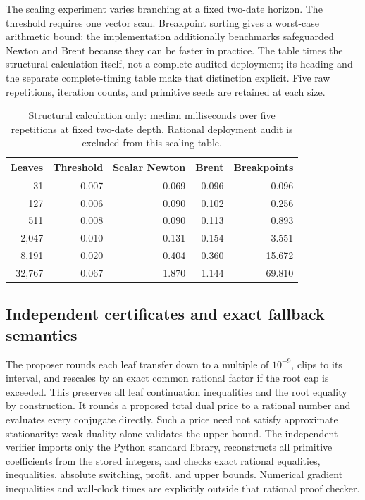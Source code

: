 \documentclass[11pt,letterpaper]{article}
\theoremstyle{definition}
\newcommand{\1}{\mathbf 1}
\begin{document}
The scaling experiment varies branching at a fixed two-date horizon. The threshold requires one vector scan. Breakpoint sorting gives a worst-case arithmetic bound; the implementation additionally benchmarks safeguarded Newton and Brent because they can be faster in practice. The table times the structural calculation itself, not a complete audited deployment; its heading and the separate complete-timing table make that distinction explicit. Five raw repetitions, iteration counts, and primitive seeds are retained at each size.

\begin{table}[htbp]
\centering
\caption{Structural calculation only: median milliseconds over five repetitions at fixed two-date depth. Rational deployment audit is excluded from this scaling table.}
\label{tab:r14-scaling}
\begin{tabular}{rrrrr}
\toprule
Leaves & Threshold & Scalar Newton & Brent & Breakpoints\\
\midrule
31 & 0.007 & 0.069 & 0.096 & 0.096\\
127 & 0.006 & 0.090 & 0.102 & 0.256\\
511 & 0.008 & 0.090 & 0.113 & 0.893\\
2,047 & 0.010 & 0.131 & 0.154 & 3.551\\
8,191 & 0.020 & 0.404 & 0.360 & 15.672\\
32,767 & 0.067 & 1.870 & 1.144 & 69.810\\
\bottomrule\end{tabular}
\end{table}


\subsection{Independent certificates and exact fallback semantics}
The proposer rounds each leaf transfer down to a multiple of $10^{-9}$, clips to its interval, and rescales by an exact common rational factor if the root cap is exceeded. This preserves all leaf continuation inequalities and the root equality by construction. It rounds a proposed total dual price to a rational number and evaluates every conjugate directly. Such a price need not satisfy approximate stationarity: weak duality alone validates the upper bound. The independent verifier imports only the Python standard library, reconstructs all primitive coefficients from the stored integers, and checks exact rational equalities, inequalities, absolute switching, profit, and upper bounds. Numerical gradient inequalities and wall-clock times are explicitly outside that rational proof checker.
\end{document}

